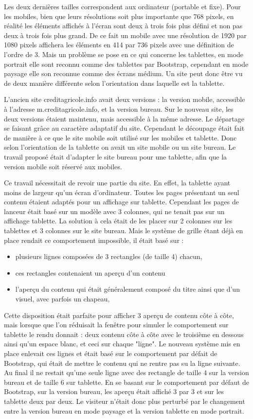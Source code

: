 \documentclass[12pt,a4paper]{article}
\begin{document}
Les deux dernières tailles correspondent aux ordinateur (portable et fixe). Pour les mobiles, bien que leurs résolutions soit plus importante que 768 pixels, en réalité les éléments affichés à l'écran sont deux à trois fois plus défini et non pas deux à trois fois plus grand. De ce fait un mobile avec une résolution de 1920 par 1080 pixels affichera les éléments en 414 par 736 pixels avec une définition de l'ordre de 3. Mais un problème se pose en ce qui concerne les tablettes, en mode portrait elle sont reconnu comme des tablettes par Bootstrap, cependant en mode paysage elle son reconnue comme des écrans médium. Un site peut donc être vu de deux manière différente selon l'orientation dans laquelle est la tablette.\par
L'ancien site creditagricole.info avait deux versions : la version mobile, accessible à l'adresse m.creditagricole.info, et la version bureau. Sur le nouveau site, les deux versions étaient maintenu, mais accessible à la même adresse. Le départage se faisant grâce au caractère adaptatif du site. Cependant le découpage était fait de manière à ce que le site mobile soit utilisé sur les mobiles et tablette. Donc selon l'orientation de la tablette on avait un site mobile ou un site bureau. Le travail proposé était d'adapter le site bureau pour une tablette, afin que la version mobile soit réservé aux mobiles.\par
Ce travail nécessitait de revoir une partie du site. En effet, la tablette ayant moins de largeur qu'un écran d'ordinateur. Toutes les pages présentant un seul contenu étaient adaptés pour un affichage sur tablette. Cependant les pages de lanceur était basé sur un modèle avec 3 colonnes, qui ne tenait pas sur un affichage tablette. La solution à cela était de les placer sur 2 colonnes sur les tablettes et 3 colonnes sur le site bureau. Mais le système de grille étant déjà en place rendait ce comportement impossible, il était basé sur :
\begin{itemize}
\item plusieurs lignes composées de 3 rectangles (de taille 4) chacun,
\item ces rectangles contenaient un aperçu d'un contenu
\item l'aperçu du contenu qui était généralement composé du titre ainsi que d'un visuel, avec parfois un chapeau,
\end{itemize}
Cette disposition était parfaite pour afficher 3 aperçu de contenu côte à côte, mais lorsque que l'on réduisait la fenêtre pour simuler le comportement sur tablette le rendu donnait : deux contenu côte à côte avec le troisième en dessous ainsi qu'un espace blanc, et ceci sur chaque "ligne". Le nouveau système mis en place enlevait ces lignes et était basé sur le comportement par défait de Bootstrap, qui était de mettre le contenu qui ne rentre pas su la ligne suivante. Au final il ne restait qu'une seule ligne avec des rectangle de taille 4 sur la version bureau et de taille 6 sur tablette. En se basant sur le comportement par défaut de Bootstrap, sur la version bureau, les aperçu était affiché 3 par 3 et sur les tablette deux par deux. Le visiteur n'était donc plus perturbé par le changement entre la version bureau en mode paysage et la version tablette en mode portrait.\par
\end{document}
